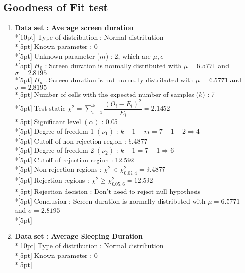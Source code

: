 \subsection*{Goodness of Fit test}

\begin{enumerate}
    \item \textbf{Data set : Average screen duration}\\*[10pt]
        Type of distribution : Normal distribution\\*[5pt]
        Known parameter : 0\\*[5pt]
        Unknown parameter ($m$) : 2, which are \(\mu, \sigma\)\\*[5pt]
        $H_0$ : Screen duration is normally distributed with $\mu=6.5771$ and $\sigma=2.8195$\\*[5pt]
        $H_a$ : Screen duration is not normally distributed with $\mu=6.5771$ and $\sigma=2.8195$\\*[5pt]
        Number of cells with the expected number of samples ($k$) : 7\\*[5pt]
        Test static \(\chi^2=\displaystyle\sum\limits^k_{i=1}\dfrac{\left(O_i-E_i\right)^2}{E_i} = 2.1452\)\\*[5pt]
        Significant level \(\left(\alpha\right)\) : 0.05\\*[5pt]
        Degree of freedom 1 \((\nu_1)\) : $k - 1 - m = 7 - 1 - 2 \Rightarrow 4$\\*[5pt]
        Cutoff of non-rejection region : 9.4877\\*[5pt]
        Degree of freedom 2 \((\nu_2)\) : $k - 1 = 7 - 1 \Rightarrow 6$\\*[5pt]
        Cutoff of rejection region : 12.592\\*[5pt]
        Non-rejection regions : \(\chi^2 < \chi^2_{0.05, 4}=9.4877\)\\*[5pt]
        Rejection regions : \(\chi^2 \geq \chi^2_{0.05, 6}=12.592\)\\*[5pt]
        Rejection decision : Don't need to reject null hypothesis\\*[5pt]
        Conclusion : Screen duration is normally distributed with $\mu=6.5771$ and $\sigma=2.8195$\\*[5pt]
    \item \textbf{Data set : Average Sleeping Duration}\\*[10pt]
        Type of distribution : Normal distribution\\*[5pt]
        Known parameter : 0\\*[5pt]

\end{enumerate}
